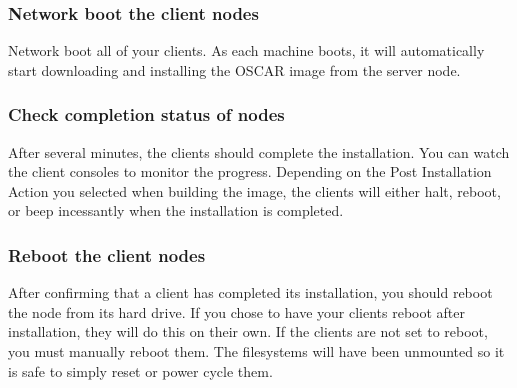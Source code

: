 \subsubsection{Network boot the client nodes}


Network boot all of your clients.  As each machine boots, it will
automatically start downloading and installing the OSCAR image from
the server node.


\subsubsection{Check completion status of nodes}
\label{det:client-finish}

After several minutes, the clients should complete the installation.
You can watch the client consoles to monitor the progress. Depending
on the Post Installation Action you selected when building the image,
the clients will either halt, reboot, or beep incessantly when the
installation is completed.

  

\subsubsection{Reboot the client nodes}

After confirming that a client has completed its installation, you
should reboot the node from its hard drive. If you chose to have your
clients reboot after installation, they will do this on their
own. If the clients are not set to reboot, you must manually
reboot them. The filesystems will have been unmounted so it is safe
to simply reset or power cycle them.


